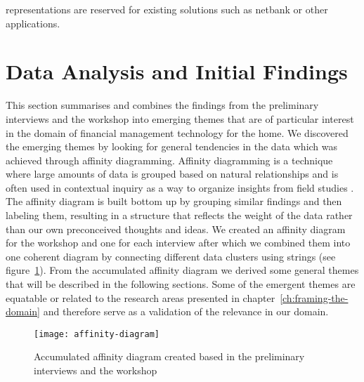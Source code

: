 representations are reserved for existing solutions such as netbank or other applications.

\section{Data Analysis and Initial Findings}
\label{sec:data-analysis-and-initial-findings}
This section summarises and combines the findings from the preliminary interviews and the workshop into emerging themes that are of particular interest in the domain of financial management technology for the home. We discovered the emerging themes by looking for general tendencies in the data which was achieved through affinity diagramming. Affinity diagramming is a technique where large amounts of data is grouped based on natural relationships and is often used in contextual inquiry as a way to organize insights from field studies \cite{beyer2010user}. The affinity diagram is built bottom up by grouping similar findings and then labeling them, resulting in a structure that reflects the weight of the data rather than our own preconceived thoughts and ideas. We created an affinity diagram for the workshop and one for each interview after which we combined them into one coherent diagram by connecting different data clusters using strings (see figure~\ref{fig:affinity-diagram}). From the accumulated affinity diagram we derived some general themes that will be described in the following sections. Some of the emergent themes are equatable or related to the research areas presented in chapter~\ref{ch:framing-the-domain} and therefore serve as a validation of the relevance in our domain.

\begin{figure}[!h]
	\centering
	\texttt{[image: affinity-diagram]}
	\caption{Accumulated affinity diagram created based in the preliminary interviews and the workshop}
	\label{fig:affinity-diagram}
\end{figure}

